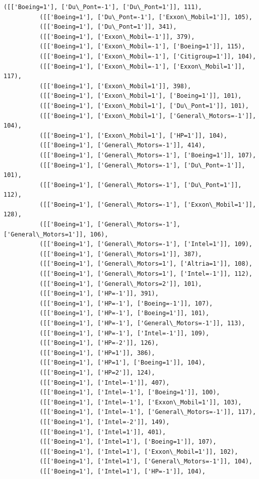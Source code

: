 \documentclass[11pt]{article}
\begin{document}
\begin{Verbatim}[commandchars=\\\{\}]
          ([['Boeing=1'], ['Du\_Pont=-1'], ['Du\_Pont=1']], 111),
          ([['Boeing=1'], ['Du\_Pont=-1'], ['Exxon\_Mobil=1']], 105),
          ([['Boeing=1'], ['Du\_Pont=1']], 341),
          ([['Boeing=1'], ['Exxon\_Mobil=-1']], 379),
          ([['Boeing=1'], ['Exxon\_Mobil=-1'], ['Boeing=1']], 115),
          ([['Boeing=1'], ['Exxon\_Mobil=-1'], ['Citigroup=1']], 104),
          ([['Boeing=1'], ['Exxon\_Mobil=-1'], ['Exxon\_Mobil=1']], 117),
          ([['Boeing=1'], ['Exxon\_Mobil=1']], 398),
          ([['Boeing=1'], ['Exxon\_Mobil=1'], ['Boeing=1']], 101),
          ([['Boeing=1'], ['Exxon\_Mobil=1'], ['Du\_Pont=1']], 101),
          ([['Boeing=1'], ['Exxon\_Mobil=1'], ['General\_Motors=-1']], 104),
          ([['Boeing=1'], ['Exxon\_Mobil=1'], ['HP=1']], 104),
          ([['Boeing=1'], ['General\_Motors=-1']], 414),
          ([['Boeing=1'], ['General\_Motors=-1'], ['Boeing=1']], 107),
          ([['Boeing=1'], ['General\_Motors=-1'], ['Du\_Pont=-1']], 101),
          ([['Boeing=1'], ['General\_Motors=-1'], ['Du\_Pont=1']], 112),
          ([['Boeing=1'], ['General\_Motors=-1'], ['Exxon\_Mobil=1']], 128),
          ([['Boeing=1'], ['General\_Motors=-1'], ['General\_Motors=1']], 106),
          ([['Boeing=1'], ['General\_Motors=-1'], ['Intel=1']], 109),
          ([['Boeing=1'], ['General\_Motors=1']], 387),
          ([['Boeing=1'], ['General\_Motors=1'], ['Altria=1']], 108),
          ([['Boeing=1'], ['General\_Motors=1'], ['Intel=-1']], 112),
          ([['Boeing=1'], ['General\_Motors=2']], 101),
          ([['Boeing=1'], ['HP=-1']], 391),
          ([['Boeing=1'], ['HP=-1'], ['Boeing=-1']], 107),
          ([['Boeing=1'], ['HP=-1'], ['Boeing=1']], 101),
          ([['Boeing=1'], ['HP=-1'], ['General\_Motors=-1']], 113),
          ([['Boeing=1'], ['HP=-1'], ['Intel=-1']], 109),
          ([['Boeing=1'], ['HP=-2']], 126),
          ([['Boeing=1'], ['HP=1']], 386),
          ([['Boeing=1'], ['HP=1'], ['Boeing=1']], 104),
          ([['Boeing=1'], ['HP=2']], 124),
          ([['Boeing=1'], ['Intel=-1']], 407),
          ([['Boeing=1'], ['Intel=-1'], ['Boeing=1']], 100),
          ([['Boeing=1'], ['Intel=-1'], ['Exxon\_Mobil=1']], 103),
          ([['Boeing=1'], ['Intel=-1'], ['General\_Motors=-1']], 117),
          ([['Boeing=1'], ['Intel=-2']], 149),
          ([['Boeing=1'], ['Intel=1']], 401),
          ([['Boeing=1'], ['Intel=1'], ['Boeing=1']], 107),
          ([['Boeing=1'], ['Intel=1'], ['Exxon\_Mobil=1']], 102),
          ([['Boeing=1'], ['Intel=1'], ['General\_Motors=-1']], 104),
          ([['Boeing=1'], ['Intel=1'], ['HP=-1']], 104),

\end{Verbatim}
\end{document}
